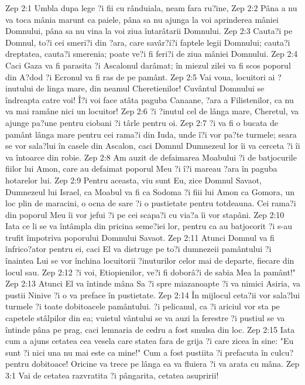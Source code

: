 Zep 2:1  Umbla dupa lege ?i fii cu rânduiala, neam fara ru?ine,
Zep 2:2  Pâna a nu va toca mânia marunt ca paiele, pâna sa nu ajunga la voi aprinderea mâniei Domnului, pâna sa nu vina la voi ziua întarâtarii Domnului.
Zep 2:3  Cauta?i pe Domnul, to?i cei smeri?i din ?ara, care savâr?i?i faptele legii Domnului; cauta?i dreptatea, cauta?i smerenia; poate ve?i fi feri?i de ziua mâniei Domnului.
Zep 2:4  Caci Gaza va fi parasita ?i Ascalonul darâmat; în miezul zilei va fi scos poporul din A?dod ?i Ecronul va fi ras de pe pamânt.
Zep 2:5  Vai voua, locuitori ai ?inutului de linga mare, din neamul Cheretienilor! Cuvântul Domnului se îndreapta catre voi! Î?i voi face atâta paguba Canaane, ?ara a Filistenilor, ca nu va mai ramâne nici un locuitor!
Zep 2:6  ?i ?inutul cel de lânga mare, Cheretul, va ajunge pa?une pentru ciobani ?i târle pentru oi.
Zep 2:7  ?i va fi o bucata de pamânt lânga mare pentru cei rama?i din Iuda, unde î?i vor pa?te turmele; seara se vor sala?lui în casele din Ascalon, caci Domnul Dumnezeul lor îi va cerceta ?i îi va întoarce din robie.
Zep 2:8  Am auzit de defaimarea Moabului ?i de batjocurile fiilor lui Amon, care au defaimat poporul Meu ?i î?i mareau ?ara în paguba hotarelor lui.
Zep 2:9  Pentru aceasta, viu sunt Eu, zice Domnul Savaot, Dumnezeul lui Israel, ca Moabul va fi ca Sodoma ?i fiii lui Amon ca Gomora, un loc plin de maracini, o ocna de sare ?i o pustietate pentru totdeauna. Cei rama?i din poporul Meu îi vor jefui ?i pe cei scapa?i cu via?a îi vor stapâni.
Zep 2:10  Iata ce li se va întâmpla din pricina seme?iei lor, pentru ca au batjocorit ?i s-au trufit împotriva poporului Domnului Savaot.
Zep 2:11  Atunci Domnul va fi înfrico?ator pentru ei, caci El va distruge pe to?i dumnezeii pamântului ?i înaintea Lui se vor închina locuitorii ?inuturilor celor mai de departe, fiecare din locul sau.
Zep 2:12  ?i voi, Etiopienilor, ve?i fi doborâ?i de sabia Mea la pamânt!"
Zep 2:13  Atunci El va întinde mâna Sa ?i spre miazanoapte ?i va nimici Asiria, va pustii Ninive ?i o va preface în pustietate.
Zep 2:14  În mijlocul ceta?ii vor sala?lui turmele ?i toate dobitoacele pamântului. ?i pelicanul, ca ?i ariciul vor sta pe capetele stâlpilor din ea; vuietul vântului se va auzi la ferestre ?i pustiul se va întinde pâna pe prag, caci lemnaria de cedru a fost smulsa din loc.
Zep 2:15  Iata cum a ajuns cetatea cea vesela care statea fara de grija ?i care zicea în sine: "Eu sunt ?i nici una nu mai este ca mine!" Cum a fost pustiita ?i prefacuta în culcu? pentru dobitoace! Oricine va trece pe lânga ea va fluiera ?i va arata cu mâna.
Zep 3:1  Vai de cetatea razvratita ?i pângarita, cetatea asupririi!
